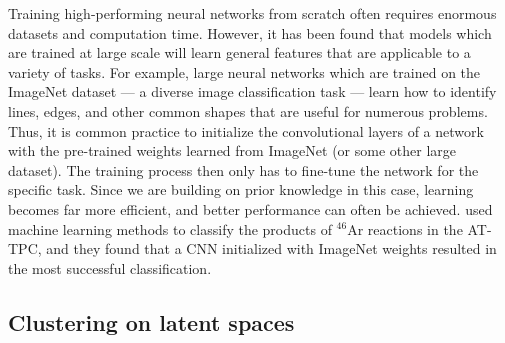 \documentclass[review,number,sort&compress]{elsarticle}
\begin{document}


Training high-performing neural networks from scratch often requires enormous datasets and computation time. However, it has been found that models which are trained at large scale will learn general features that are applicable to a variety of tasks. For example, large neural networks which are trained on the ImageNet dataset \cite{Russakovsky2015} --- a diverse image classification task --- learn how to identify lines, edges, and other common shapes that are useful for numerous problems. Thus, it is common practice to initialize the convolutional layers of a network with the pre-trained weights learned from ImageNet (or some other large dataset). The training process then only has to fine-tune the network for the specific task. Since we are building on prior knowledge in this case, learning becomes far more efficient, and better performance can often be achieved. \citet{Kuchera2019} used machine learning methods to classify the products of $^{46}$Ar reactions in the AT-TPC, and they found that a CNN initialized with ImageNet weights resulted in the most successful classification.

\subsection{Clustering on latent spaces}

\end{document}
